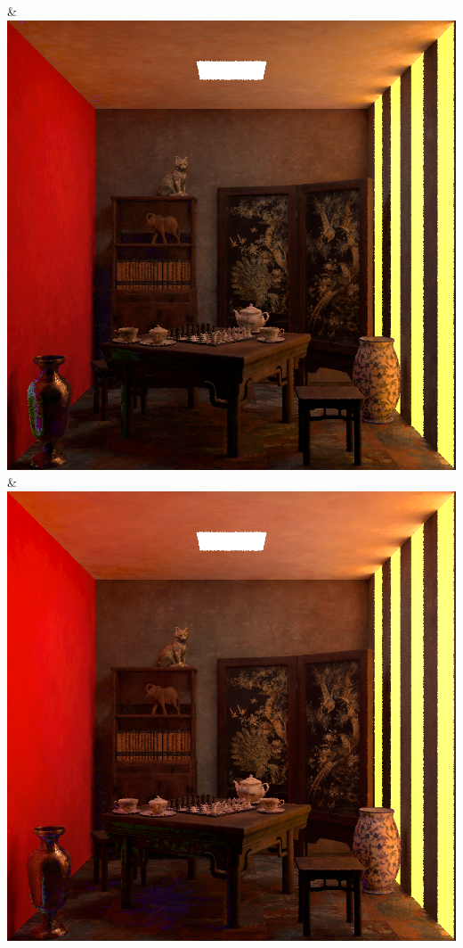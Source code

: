 & \includegraphics[width=\linewidth]{figures/py/tests/quality_comparison/nrc+pt_1spp_chess.png}
& \includegraphics[width=\linewidth]{figures/py/tests/quality_comparison/nrc+pt+sl_1spp_chess.png}
